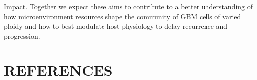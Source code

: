 \documentclass[times,twoside]{zHenriquesLab-StyleBioRxiv}
\begin{document}
Impact.   Together we expect these aims to contribute to a better understanding of how microenvironment resources shape the community of GBM cells of varied ploidy and how to best modulate host physiology to delay recurrence and progression.

\clearpage


\section*{REFERENCES}



\end{document}
